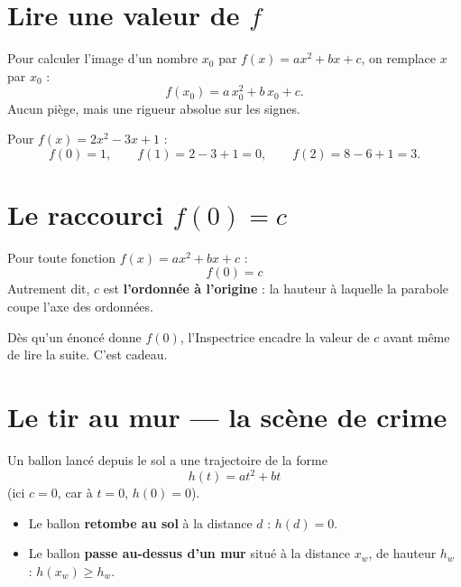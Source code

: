 \documentclass[11pt,a4paper]{article}
\begin{document}
\section{Lire une valeur de \texorpdfstring{$f$}{f}}

\begin{methode}[Calculer $f(x_0)$]
Pour calculer l'image d'un nombre $x_0$ par $f(x) = ax^2+bx+c$, on remplace $x$ par $x_0$ :
\[
  f(x_0) = a\,x_0^2 + b\,x_0 + c.
\]
Aucun piège, mais une rigueur absolue sur les signes.
\end{methode}

\begin{rapport}
Pour $f(x) = 2x^2 - 3x + 1$ :
\[
  f(0) = 1, \qquad f(1) = 2 - 3 + 1 = 0, \qquad f(2) = 8 - 6 + 1 = 3.
\]
\end{rapport}

\section{Le raccourci \texorpdfstring{$f(0) = c$}{f(0) = c}}

\begin{indice}
Pour toute fonction $f(x) = ax^2+bx+c$ :
\[
  \boxed{\;f(0) = c\;}
\]
Autrement dit, $c$ est \textbf{l'ordonnée à l'origine} : la hauteur à laquelle la parabole coupe l'axe des ordonnées.
\end{indice}

\begin{methode}
Dès qu'un énoncé donne $f(0)$, l'Inspectrice encadre la valeur de $c$ avant même de lire la suite. C'est cadeau.
\end{methode}

\section{Le tir au mur — la scène de crime}

\begin{indice}
Un ballon lancé depuis le sol a une trajectoire de la forme
\[
  h(t) = at^2 + bt
\]
(ici $c = 0$, car à $t=0$, $h(0)=0$).
\begin{itemize}[leftmargin=*]
  \item Le ballon \textbf{retombe au sol} à la distance $d$ : $h(d) = 0$.
  \item Le ballon \textbf{passe au-dessus d'un mur} situé à la distance $x_w$, de hauteur $h_w$ : $h(x_w) \geq h_w$.
\end{itemize}
\end{indice}
\end{document}
